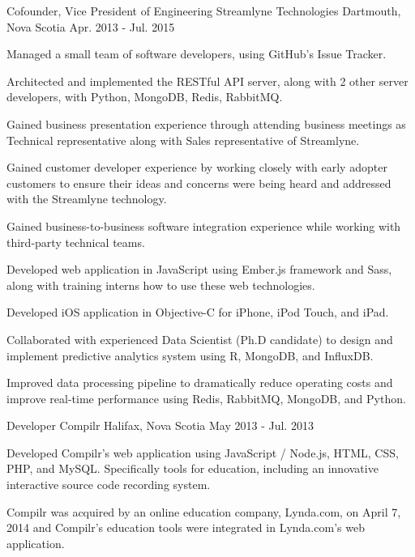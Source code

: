 \begin{cventries}
  \cventry
    {Cofounder, Vice President of Engineering} %
    {Streamlyne Technologies}  %
    {Dartmouth, Nova Scotia} %
    {Apr. 2013 - Jul. 2015} %
    {
      \begin{cvitems} %
	\item {Managed a small team of software developers, using GitHub's Issue Tracker.}
	\item {Architected and implemented the RESTful API server, along with 2 other server developers, with Python, MongoDB, Redis, RabbitMQ.}
	\item {Gained business presentation experience through attending business meetings as Technical representative along with Sales representative of Streamlyne.}
	\item {Gained customer developer experience by working closely with early adopter customers to ensure their ideas and concerns were being heard and addressed with the Streamlyne technology.}
	\item {Gained business-to-business software integration experience while working with third-party technical teams.}
	\item {Developed web application in JavaScript using Ember.js framework and Sass, along with training interns how to use these web technologies.}
	\item {Developed iOS application in Objective-C for iPhone, iPod Touch, and iPad.}
	\item {Collaborated with experienced Data Scientist (Ph.D candidate) to design and implement predictive analytics system using R, MongoDB, and InfluxDB.}
	\item {Improved data processing pipeline to dramatically reduce operating costs and improve real-time performance using Redis, RabbitMQ, MongoDB, and Python.}
      \end{cvitems} 
    }

  \cventry
    {Developer} %
    {Compilr} %
    {Halifax, Nova Scotia} %
    {May 2013 - Jul. 2013} %
    {
      \begin{cvitems} %
	\item {Developed Compilr's web application using JavaScript / Node.js, HTML, CSS, PHP, and MySQL. Specifically tools for education, including an innovative interactive source code recording system.}
	\item {Compilr was acquired by an online education company, Lynda.com, on April 7, 2014 and Compilr's education tools were integrated in Lynda.com's web application.}
      \end{cvitems}
    }


\end{cventries}
